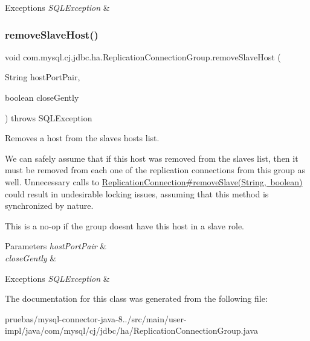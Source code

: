 \begin{DoxyExceptions}{Exceptions}
{\em S\+Q\+L\+Exception} & \\
\hline
\end{DoxyExceptions}
\mbox{\label{classcom_1_1mysql_1_1cj_1_1jdbc_1_1ha_1_1_replication_connection_group_a9aa1953764777765fa5c2b58498534a1}} 
\subsubsection{\texorpdfstring{remove\+Slave\+Host()}{removeSlaveHost()}}
{\footnotesize\ttfamily void com.\+mysql.\+cj.\+jdbc.\+ha.\+Replication\+Connection\+Group.\+remove\+Slave\+Host (\begin{DoxyParamCaption}\item[{String}]{host\+Port\+Pair,  }\item[{boolean}]{close\+Gently }\end{DoxyParamCaption}) throws S\+Q\+L\+Exception}

Removes a host from the slaves hosts list.

We can safely assume that if this host was removed from the slaves list, then it must be removed from each one of the replication connections from this group as well. Unnecessary calls to \mbox{\hyperlink{}{Replication\+Connection\#remove\+Slave(\+String, boolean)}} could result in undesirable locking issues, assuming that this method is synchronized by nature.

This is a no-\/op if the group doesn\textquotesingle{}t have this host in a slave role.


\begin{DoxyParams}{Parameters}
{\em host\+Port\+Pair} & \\
\hline
{\em close\+Gently} & \\
\hline
\end{DoxyParams}

\begin{DoxyExceptions}{Exceptions}
{\em S\+Q\+L\+Exception} & \\
\hline
\end{DoxyExceptions}


The documentation for this class was generated from the following file\+:\begin{DoxyCompactItemize}
\item 
pruebas/mysql-\/connector-\/java-\/8../src/main/user-\/impl/java/com/mysql/cj/jdbc/ha/Replication\+Connection\+Group.\+java\end{DoxyCompactItemize}
